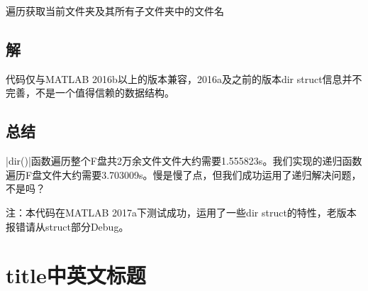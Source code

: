 \begin{algorithm}[H]
\caption{遍历获取当前文件夹及其所有子文件夹中的文件名}
\label{get_all_file_name}
\end{algorithm}

\subsection*{解}

代码仅与MATLAB 2016b以上的版本兼容，2016a及之前的版本dir struct信息并不完善，不是一个值得信赖的数据结构。


\subsection*{总结}
\Matlabinline|dir()|函数遍历整个F盘共2万余文件文件大约需要1.555823s。我们实现的递归函数遍历F盘文件大约需要3.703009s。慢是慢了点，但我们成功运用了递归解决问题，不是吗？

注：本代码在MATLAB 2017a下测试成功，运用了一些dir struct的特性，老版本报错请从struct部分Debug。

\section{title中英文标题}